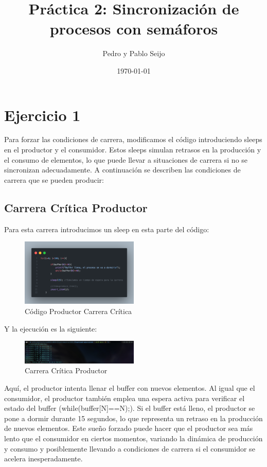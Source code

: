 \documentclass[twocolumn]{article}
\title{Práctica 2: Sincronización de procesos con semáforos}
\author{Pedro y Pablo Seijo}
\date{\today}
\begin{document}
\maketitle

\section{Ejercicio 1}

Para forzar las condiciones de carrera, modificamos el código introduciendo sleeps en el productor y el consumidor. Estos sleeps simulan retrasos en la producción y el consumo de elementos, lo que puede llevar a situaciones de carrera si no se sincronizan adecuadamente. A continuación se describen las condiciones de carrera que se pueden producir:

\subsection{Carrera Crítica Productor}

Para esta carrera introducimos un sleep en esta parte del código:

\begin{figure}[H]
    \centering
    \includegraphics[width=0.5\textwidth]{ejercicio1/productorSleep.png}
    \caption{Código Productor Carrera Crítica} 
    \label{fig:my_label}
\end{figure}

Y la ejecución es la siguiente:

\begin{figure}[H]
    \centering
    \includegraphics[width=0.5\textwidth]{ejercicio1/productorCarrera.jpg}
    \caption{Carrera Crítica Productor} 
    \label{fig:my_label}
\end{figure}

Aquí, el productor intenta llenar el buffer con nuevos elementos.  Al igual que el consumidor, el productor también emplea una espera activa para verificar el estado del buffer (while(buffer[N]==N);). Si el buffer está lleno, el productor se pone a dormir durante 15 segundos, lo que representa un retraso en la producción de nuevos elementos. Este sueño forzado puede hacer que el productor sea más lento que el consumidor en ciertos momentos, variando la dinámica de producción y consumo y posiblemente llevando a condiciones de carrera si el consumidor se acelera inesperadamente.
\end{document}
